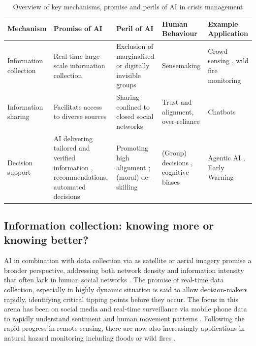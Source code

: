 \documentclass[pdflatex,sn-apa]{sn-jnl}%
\begin{document}
\begin{table}
    \small
    \centering
    \begin{tabular}{p{} | p{} p{}p{} p{}}
        \hline
        \textbf{Mechanism} & \textbf{Promise of AI} &\textbf{ Peril of AI} & \textbf{Human Behaviour} & \textbf{Example Application}\\ \hline
        Information collection & Real-time large-scale information collection \citep{narmatha2025disaster} & Exclusion of marginalised or digitally invisible groups \citep{coleman2024weaving} & Sensemaking \citep{klein2010rapid} & Crowd sensing \citep{mai2025evaluating}, wild fire monitoring \citep{roy2024multi}\\ \hline
        Information sharing & Facilitate access to diverse sources \citep{jeon2024hearhere} & Sharing confined to closed social networks & Trust and alignment, over-reliance \citep{manzini2024should} & Chatbots \citep{urbanelli2024ermes}\\ \hline
        Decision support &  AI delivering tailored and verified information \citep{zhao2025tailoring}, recommendations, automated decisions & Promoting high alignment \citep{manzini2024should}; (moral) de-skilling \citep{vallor2015moral} & (Group) decisions \citep{comes2024ai}, cognitive biases \citep{paulus2022influence} & Agentic AI \citep{acharya2025agentic}, Early Warning \citep{reichstein2025early}\\ \hline
    \end{tabular}
    \caption{Overview of key mechanisms, promise and perils of AI in crisis management}
    \label{tab:AIcrisis-overview}
\end{table}


\subsection{Information collection: knowing more or knowing better?}
AI in combination with data collection via as satellite or aerial imagery promise a broader perspective, addressing both network density and information intensity that often lack in human social networks \citep{pan2012crisis}. The promise of real-time data collection, especially in highly dynamic situation is said to allow decision-makers rapidly, identifying critical tipping points before they occur. The focus in this arena has been on social media and real-time surveillance via mobile phone data to rapidly understand sentiment and human movement patterns \citep{middleton2013real, qadir2016crisis, mai2025evaluating}. Following the rapid progress in remote sensing, there are now also increasingly applications in natural hazard monitoring including floods \citep{zhou2024threshold} or wild fires \citep{roy2024multi}.
\end{document}
